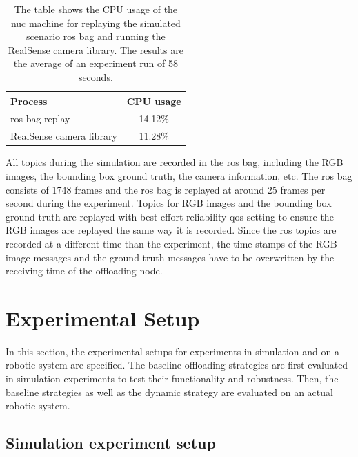 \begin{table}[htp]
    \centering
    \begin{tabular}{lc}
    \toprule
    Process&                    CPU usage\\
    \midrule
    \gls{ros} bag replay&       14.12\%\\
    RealSense camera library&   11.28\%\\
    \bottomrule
    \end{tabular}
    \caption[Comparison of CPU usage on the robotic system]{The table shows the CPU usage of the \gls{nuc} machine for replaying the simulated scenario \gls{ros} bag and running the RealSense camera library. The results are the average of an experiment run of 58 seconds.}
    \label{tab:ros_bag_comparison}
\end{table}

All topics during the simulation are recorded in the \gls{ros} bag, including the RGB images, the bounding box ground truth, the camera information, etc. The \gls{ros} bag consists of 1748 frames and the \gls{ros} bag is replayed at around 25 frames per second during the experiment. Topics for RGB images and the bounding box ground truth are replayed with best-effort reliability \gls{qos} setting to ensure the RGB images are replayed the same way it is recorded. Since the \gls{ros} topics are recorded at a different time than the experiment, the time stamps of the RGB image messages and the ground truth messages have to be overwritten by the receiving time of the offloading node.

\section{Experimental Setup}\label{sec:experiment_setup}

In this section, the experimental setups for experiments in simulation and on a robotic system are specified. The baseline offloading strategies are first evaluated in simulation experiments to test their functionality and robustness. Then, the baseline strategies as well as the dynamic strategy are evaluated on an actual robotic system. 

\subsection{Simulation experiment setup}

